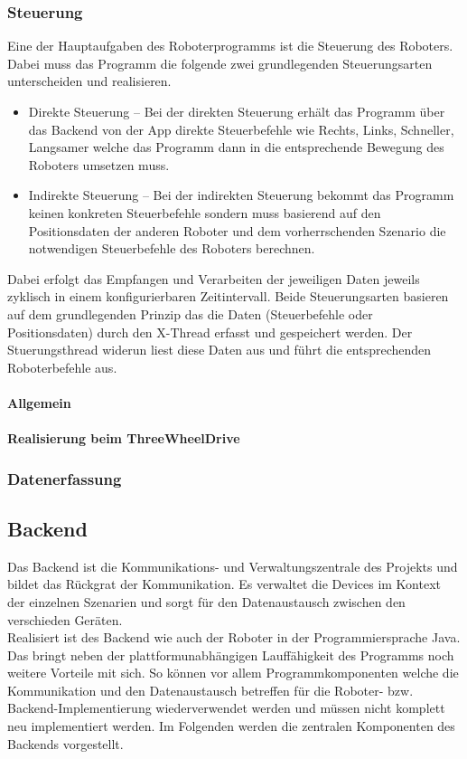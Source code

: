 \subsubsection{Steuerung}
Eine der Hauptaufgaben des Roboterprogramms ist die Steuerung des Roboters. Dabei muss das Programm die folgende zwei 
grundlegenden Steuerungsarten unterscheiden und realisieren.
\begin{itemize}
	\item{Direkte Steuerung} -- Bei der direkten Steuerung erhält das Programm über das Backend von der App direkte Steuerbefehle wie
	Rechts, Links, Schneller, Langsamer welche das Programm dann in die entsprechende Bewegung des Roboters umsetzen muss.
	\item{Indirekte Steuerung} -- Bei der indirekten Steuerung bekommt das Programm keinen konkreten Steuerbefehle sondern muss basierend
	auf den Positionsdaten der anderen Roboter und dem vorherrschenden Szenario die notwendigen Steuerbefehle des Roboters berechnen.
\end{itemize}
Dabei erfolgt das Empfangen und Verarbeiten der jeweiligen Daten jeweils zyklisch in einem konfigurierbaren Zeitintervall. Beide Steuerungsarten
basieren auf dem grundlegenden Prinzip das die Daten (Steuerbefehle oder Positionsdaten) durch den X-Thread erfasst und gespeichert werden.
Der Stuerungsthread widerun liest diese Daten aus und führt die entsprechenden Roboterbefehle aus.
\paragraph{Allgemein}
\paragraph{Realisierung beim ThreeWheelDrive}
\subsubsection{Datenerfassung}
\subsection{Backend}
Das Backend ist die Kommunikations- und Verwaltungszentrale des Projekts und bildet das Rückgrat der Kommunikation. Es verwaltet die 
Devices im Kontext der einzelnen Szenarien und sorgt für den Datenaustausch zwischen den verschieden Geräten. \\
Realisiert ist des Backend wie auch der Roboter in der Programmiersprache Java. Das bringt neben der plattformunabhängigen 
Lauffähigkeit des Programms noch weitere Vorteile mit sich. So können vor allem Programmkomponenten welche die Kommunikation und
den Datenaustausch betreffen für die Roboter- bzw. Backend-Implementierung wiederverwendet werden und müssen nicht komplett neu
implementiert werden.
Im Folgenden werden die zentralen Komponenten des Backends vorgestellt.
